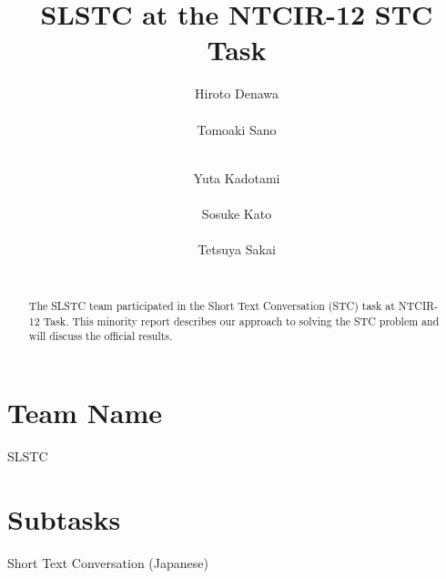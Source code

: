 \documentclass{../style/sig-alternate}
\begin{document}
\title{SLSTC at the NTCIR-12 STC Task}

\author{
%
%
\alignauthor
Hiroto Denawa\\
       \\
\alignauthor
Tomoaki Sano\\
       \\
\and  %
\alignauthor
Yuta Kadotami\\
       \\
\alignauthor
Sosuke Kato\\
       \\
\alignauthor
Tetsuya Sakai\\
       \\
}

\maketitle

\begin{abstract}
The SLSTC team participated in the Short Text Conversation (STC) task at NTCIR-12 Task.
This minority report describes our approach to solving the STC problem and will discuss the official results.
\end{abstract}

\section*{Team Name}
SLSTC

\section*{Subtasks}
Short Text Conversation (Japanese)
\end{document}
